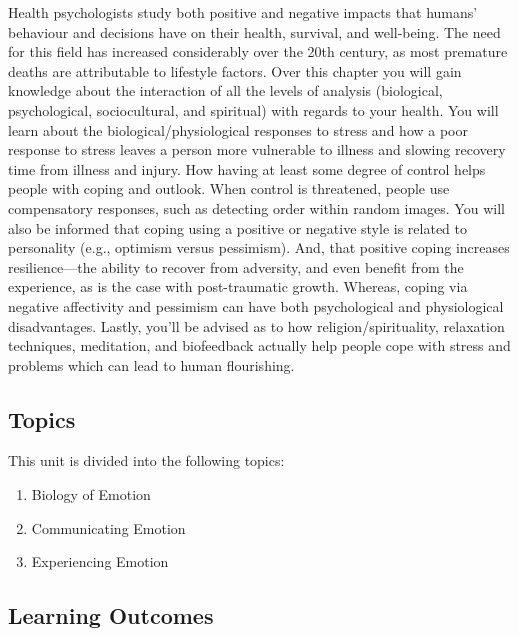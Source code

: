 \documentclass[
]{book}
\providecommand{\tightlist}{%
  \setlength{\itemsep}{0pt}\setlength{\parskip}{0pt}}
\begin{document}
Health psychologists study both positive and negative impacts that humans' behaviour and decisions have on their health, survival, and well-being. The need for this field has increased considerably over the 20th century, as most premature deaths are attributable to lifestyle factors. Over this chapter you will gain knowledge about the interaction of all the levels of analysis (biological, psychological, sociocultural, and spiritual) with regards to your health. You will learn about the biological/physiological responses to stress and how a poor response to stress leaves a person more vulnerable to illness and slowing recovery time from illness and injury. How having at least some degree of control helps people with coping and outlook. When control is threatened, people use compensatory responses, such as detecting order within random images. You will also be informed that coping using a positive or negative style is related to personality (e.g., optimism versus pessimism). And, that positive coping increases resilience---the ability to recover from adversity, and even benefit from the experience, as is the case with post-traumatic growth. Whereas, coping via negative affectivity and pessimism can have both psychological and physiological disadvantages. Lastly, you'll be advised as to how religion/spirituality, relaxation techniques, meditation, and biofeedback actually help people cope with stress and problems which can lead to human flourishing.

\hypertarget{topics-6}{%
\subsection*{Topics}\label{topics-6}}

This unit is divided into the following topics:

\begin{enumerate}
\def\labelenumi{\arabic{enumi}.}
\tightlist
\item
  Biology of Emotion\\
\item
  Communicating Emotion\\
\item
  Experiencing Emotion
\end{enumerate}

\hypertarget{learning-outcomes-6}{%
\subsection*{Learning Outcomes}\label{learning-outcomes-6}}
\end{document}
